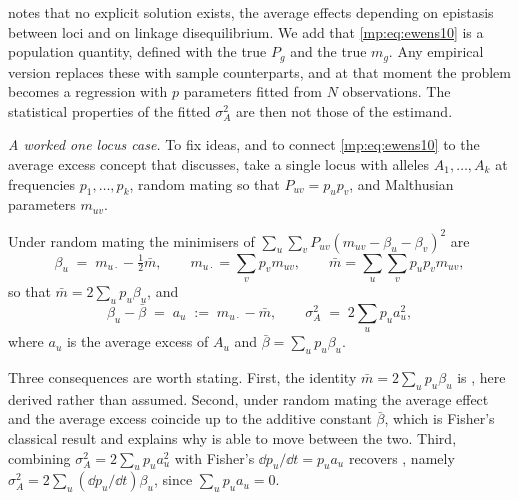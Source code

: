 \citet{mp:ewens2024} notes that no explicit solution exists, the average effects depending on
epistasis between loci and on linkage disequilibrium. We add that \eqref{mp:eq:ewens10} is a
population quantity, defined with the true $P_g$ and the true $m_g$. Any empirical version
replaces these with sample counterparts, and at that moment the problem becomes a regression
with $p$ parameters fitted from $N$ observations. The statistical properties of the fitted
$\sigma_A^2$ are then not those of the estimand.

\label{mp:sec:onelocus}

\medskip
\noindent\emph{A worked one locus case.} To fix ideas, and to connect \eqref{mp:eq:ewens10} to the average excess concept that \citet{mp:ewens2024} discusses, take a single locus with alleles $A_1,\dots,A_k$ at frequencies
$p_1,\dots,p_k$, random mating so that $P_{uv}=p_up_v$, and Malthusian parameters $m_{uv}$.

\begin{proposition}
\label{mp:prop:onelocus}
Under random mating the minimisers of $\sum_u\sum_v P_{uv}(m_{uv}-\beta_u-\beta_v)^2$ are
\[
\beta_u \;=\; m_{u\cdot} - \tfrac12\bar m,
\qquad m_{u\cdot}=\sum_v p_v m_{uv},
\qquad \bar m = \sum_u\sum_v p_up_v m_{uv},
\]
so that $\bar m = 2\sum_u p_u\beta_u$, and
\[
\beta_u - \bar\beta \;=\; a_u \;:=\; m_{u\cdot}-\bar m,
\qquad
\sigma_A^2 \;=\; 2\sum_u p_u a_u^2 ,
\]
where $a_u$ is the average excess of $A_u$ and $\bar\beta=\sum_up_u\beta_u$.
\end{proposition}

Three consequences are worth stating. First, the identity $\bar m=2\sum_u p_u\beta_u$ is
\citet[Equation 3]{mp:ewens2024}, here derived rather than assumed. Second, under random mating the
average effect and the average excess coincide up to the additive constant $\bar\beta$,
which is Fisher's classical result and explains why \citet{mp:ewens2024} is able to move between
the two. Third, combining $\sigma_A^2=2\sum_u p_u a_u^2$ with Fisher's
$\dd p_u/\dd t=p_u a_u$ recovers \citet[Equation 2]{mp:ewens2024}, namely
$\sigma_A^2=2\sum_u(\dd p_u/\dd t)\beta_u$, since $\sum_u p_u a_u=0$.

